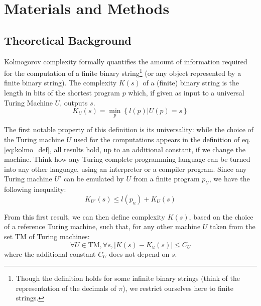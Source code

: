 \documentclass[entropy,article,submit,moreauthors,pdftex]{Definitions/mdpi}
\begin{document}
\section{Materials and Methods}

\subsection{Theoretical Background}
\label{sec:theory}
Kolmogorov complexity formally quantifies the amount of information required
for the computation of a finite binary string\footnote{Though the definition
    holds for some infinite binary strings (think of the representation of the
    decimals of $\pi$), we restrict ourselves here to finite strings.} (or
any object represented by a finite binary
string)\cite{kolmogorov_three_1965,li_introduction_2008}. The complexity $K(s)$ of a (finite) binary string is the length in bits of the shortest program $p$
which, if given as input to a universal Turing Machine $U$, outputs $s$.
\begin{equation}
    \label{eq:kolmo_def}
    K_{U}(s) = \min_{p}\left\{l(p)|U(p)=s\right\}
\end{equation}

The first notable property of this definition is its universality: while the
choice of the Turing machine $U$ used for the computations appears in the
definition of eq. \ref{eq:kolmo_def}, all results hold, up to an additional
constant, if we change the machine. Think how any Turing-complete programming language can
be turned into any other language, using an interpreter or a compiler program. Since any
Turing machine $U'$ can be emulated by $U$ from a
finite program $p_{U}$, we have the following inequality:
\begin{equation}
    \label{eq:inequality_univ}
    K_{U'}(s) \le l(p_{u}) + K_{U}(s)
\end{equation}

From this first result, we can then define complexity $K(s)$, based on the choice of a reference Turing machine, such that, for any other
machine $U$ taken from the set $\text{TM}$ of Turing machines:
\begin{equation}
    \forall U\in\text{TM}, \forall s, |K(s) - K_{u}(s)| \le C_{U}
\end{equation}
where the additional constant $C_{U}$ does not depend on $s$.
\end{document}
